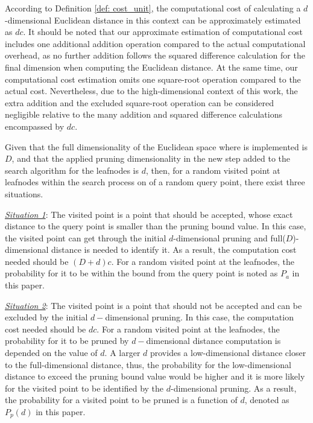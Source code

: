 According to Definition \ref{def: cost_unit}, the computational cost of calculating a $d$-dimensional Euclidean distance in this context can be approximately estimated as $dc$. It should be noted that our approximate estimation of computational cost includes one additional addition operation compared to the actual computational overhead, as no further addition follows the squared difference calculation for the final dimension when computing the Euclidean distance. At the same time, our computational cost estimation omits one square-root operation compared to the actual cost. Nevertheless, due to the high-dimensional context of this work, the extra addition and the excluded square-root operation can be considered negligible relative to the many addition and squared difference calculations encompassed by $dc$.


Given that the full dimensionality of the Euclidean space where \fdknnj is implemented is $D$, and that the applied pruning dimensionality in the new step added to the search algorithm for the leafnodes is $d$, then, for a random visited point at leafnodes within the search process on \dualtree of a random query point, there exist three situations.

\noindent \underline{\textit{Situation 1}}: The visited point is a point that should be accepted, whose exact distance to the query point is smaller than the pruning bound value. In this case, the visited point can get through the initial $d$-dimensional pruning and full($D$)-dimensional distance is needed to identify it. As a result, the computation cost needed should be $(D+d)c$. For a random visited point at the leafnodes, the probability for it to be within the bound from the query point is noted as $P_a$ in this paper.

\noindent\underline {\textit{Situation 2}}: The visited point is a point that should not be accepted and can be excluded by the initial $d-$dimensional pruning. In this case, the computation cost needed should be $dc$. For a random visited point at the leafnodes, the probability for it to be pruned by $d-$dimensional distance computation is depended on the value of $d$. A larger $d$ provides a low-dimensional distance closer to the full-dimensional distance, thus, the probability for the low-dimensional distance to exceed the pruning bound value would be higher and it is more likely for the visited point to be identified by the $d$-dimensional pruning. As a result, the probability for a visited point to be pruned is a function of $d$, denoted as $P_{p}(d)$ in this paper.

